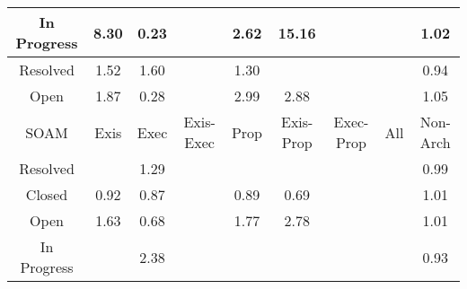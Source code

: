 \begin{tabular}{|c||c|c|c|c|c|c|c|c|}
\hline
In Progress & \cellcolor[rgb]{0.8733742233541099,0.8226509479045783,0.42} 8.30 & \cellcolor[rgb]{0.76,0.13,0.28} 0.23 &  & \cellcolor[rgb]{0.9018546726348453,0.8361416870375582,0.41999999999999993} 2.62 & \cellcolor[rgb]{0.8389510569043953,0.8063452374810293,0.42} 15.16 &  &  & \cellcolor[rgb]{0.9098948705532995,0.8399502018410366,0.42} 1.02 \\ 
\hline
Resolved & \cellcolor[rgb]{0.9073915955176428,0.8387644399820413,0.42} 1.52 & \cellcolor[rgb]{0.9069663269424656,0.8385629969727468,0.42} 1.60 &  & \cellcolor[rgb]{0.9085026143430452,0.8392907120572319,0.42} 1.30 &  &  &  & \cellcolor[rgb]{0.8990894734107386,0.7883568408108296,0.4098168418500227} 0.94 \\ 
\hline
Open & \cellcolor[rgb]{0.9056202636068323,0.8379253880242891,0.42} 1.87 & \cellcolor[rgb]{0.7703192695730531,0.17884454264578453,0.2896313182681829} 0.28 &  & \cellcolor[rgb]{0.8999924160860953,0.8352595655144662,0.42} 2.99 & \cellcolor[rgb]{0.9005452529365102,0.8355214356015048,0.42} 2.88 &  &  & \cellcolor[rgb]{0.9097350000182225,0.8398744736928422,0.42} 1.05 \\ 
\hline
\hline
SOAM & Exis & Exec & Exis-Exec & Prop & Exis-Prop & Exec-Prop & All & Non-Arch \\ 
\hline
Resolved &  & \cellcolor[rgb]{0.9085473378049849,0.8393118968549927,0.42} 1.29 &  &  &  &  &  & \cellcolor[rgb]{0.9074961160500802,0.8281482826370463,0.4176630416467415} 0.99 \\ 
\hline
Closed & \cellcolor[rgb]{0.8941051763122563,0.7647645012113462,0.4051648312247725} 0.92 & \cellcolor[rgb]{0.8846467262418739,0.7199945042115362,0.3963369444924156} 0.87 &  & \cellcolor[rgb]{0.8894821559032952,0.7428822046089302,0.40085001217640875} 0.89 & \cellcolor[rgb]{0.8498334054169098,0.5552114523067058,0.363844511722449} 0.69 &  &  & \cellcolor[rgb]{0.9099651847917026,0.8399835085855433,0.42} 1.01 \\ 
\hline
Open & \cellcolor[rgb]{0.9068327237553732,0.8384997112525451,0.42} 1.63 & \cellcolor[rgb]{0.8482842843873344,0.5478789461000492,0.3623986654281787} 0.68 &  & \cellcolor[rgb]{0.9061221677820441,0.838163132107284,0.42} 1.77 & \cellcolor[rgb]{0.9010477970055022,0.8357594827920799,0.42} 2.78 &  &  & \cellcolor[rgb]{0.9099700508636246,0.83998581356698,0.42} 1.01 \\ 
\hline
In Progress &  & \cellcolor[rgb]{0.903075013850648,0.8367197434029386,0.42} 2.38 &  &  &  &  &  & \cellcolor[rgb]{0.8956067950424632,0.7718721632009928,0.4065663420396324} 0.93 \\ 

\end{tabular}

